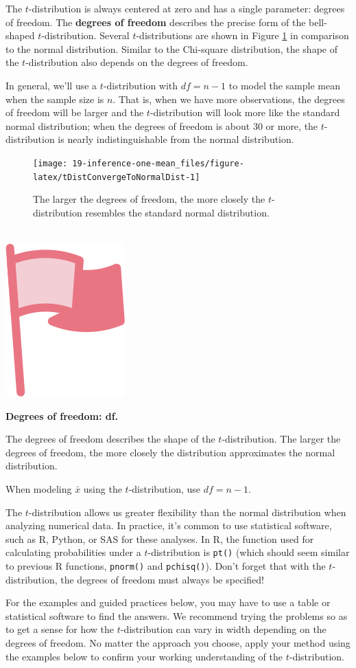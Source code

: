 \documentclass[
  10pt,
  openany]{book}
\newenvironment{mdframedwithfootImportant}
{   
    \savenotes
    \begin{mdframed}[%
    topline=true, bottomline=true, linecolor=oiR, linewidth=0.5pt,
    rightline=false, leftline=false,
    backgroundcolor=oiLGray]
    \renewcommand{\thempfootnote}{\arabic{footnote}}
    }
{
    \end{mdframed}
    \spewnotes
}
\newenvironment{important}{
    \let\oldtextbf\textbf
    \renewcommand{\textbf}[1]{{\textcolor{oiR}{\oldtextbf{##1}}}}
\vspace{4mm}
\begin{mdframedwithfootImportant}
\begin{minipage}[t]{0.10\textwidth}
{$\:$ \\ \setkeys{Gin}{width=2.5em,keepaspectratio}\includegraphics{images/_icons/important.png}}
\end{minipage}
\hfill
\begin{minipage}[t]{0.90\textwidth}
\vspace{-2mm}
\setlength{\parskip}{1em}
}{\end{minipage}
\end{mdframedwithfootImportant}
\vspace{4mm}
}
\begin{document}
The \(t\)-distribution is always centered at zero and has a single parameter: degrees of freedom.
The \textbf{degrees of freedom} describes the precise form of the bell-shaped \(t\)-distribution.
Several \(t\)-distributions are shown in Figure \ref{fig:tDistConvergeToNormalDist} in comparison to the normal distribution.
Similar to the Chi-square distribution, the shape of the \(t\)-distribution also depends on the degrees of freedom.

In general, we'll use a \(t\)-distribution with \(df = n - 1\) to model the sample mean when the sample size is \(n.\) That is, when we have more observations, the degrees of freedom will be larger and the \(t\)-distribution will look more like the standard normal distribution; when the degrees of freedom is about 30 or more, the \(t\)-distribution is nearly indistinguishable from the normal distribution.

\begin{figure}[h]

{\centering \texttt{[image: 19-inference-one-mean\_files/figure-latex/tDistConvergeToNormalDist-1]} 

}

\caption{The larger the degrees of freedom, the more closely the $t$-distribution resembles the standard normal distribution.}\label{fig:tDistConvergeToNormalDist}
\end{figure}

\begin{important}
\textbf{Degrees of freedom: df.}

The degrees of freedom describes the shape of the \(t\)-distribution.
The larger the degrees of freedom, the more closely the distribution approximates the normal distribution.

When modeling \(\bar{x}\) using the \(t\)-distribution, use \(df = n - 1.\)

\end{important}

The \(t\)-distribution allows us greater flexibility than the normal distribution when analyzing numerical data.
In practice, it's common to use statistical software, such as R, Python, or SAS for these analyses.
In R, the function used for calculating probabilities under a \(t\)-distribution is \texttt{pt()} (which should seem similar to previous R functions, \texttt{pnorm()} and \texttt{pchisq()}).
Don't forget that with the \(t\)-distribution, the degrees of freedom must always be specified!

For the examples and guided practices below, you may have to use a table or statistical software to find the answers.
We recommend trying the problems so as to get a sense for how the \(t\)-distribution can vary in width depending on the degrees of freedom.
No matter the approach you choose, apply your method using the examples below to confirm your working understanding of the \(t\)-distribution.
\end{document}
